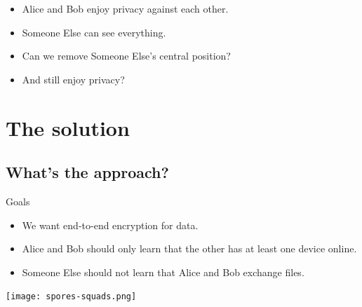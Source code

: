 \begin{frame}
  \begin{remark}
    \begin{itemize}
      \item Alice and Bob enjoy privacy against each other.
      \item Someone Else can see everything.
    \end{itemize}
  \end{remark}

  \pause

  \begin{question}
    \begin{itemize}
      \item Can we remove Someone Else's central position?
      \item And still enjoy privacy?
    \end{itemize}
  \end{question}
\end{frame}


\section{The solution}

\subsection{What's the approach?}

\begin{frame}
  \begin{block}{Goals}
  \begin{itemize}
    \item We want end-to-end encryption for data.
    \item Alice and Bob should only learn that the other has at least one 
      device online.
    \item Someone Else should not learn that Alice and Bob exchange files.
    \end{itemize}
  \end{block}
\end{frame}

\begin{frame}

  \begin{center}
    \texttt{[image: spores-squads.png]}
  \end{center}
\end{frame}

